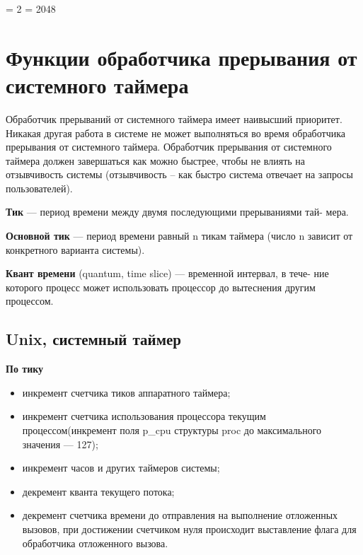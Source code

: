 \documentclass[a4paper,14pt,russian]{extreport}
\begin{document}
    \righthyphenmin = 2
    \tolerance = 2048
    
    
    \chapter{Функции обработчика прерывания от системного таймера}    
    Обработчик прерываний от системного таймера имеет наивысший приоритет.
    Никакая другая работа в системе не может выполняться во время обработчика прерывания от системного таймера.
    Обработчик прерывания от системного таймера должен завершаться как можно быстрее, чтобы не влиять на отзывчивость системы (отзывчивость – как быстро система отвечает на запросы пользователей).
    
    \textbf{Тик} --- период времени между двумя последующими прерываниями тай-
    мера.
    
    \textbf{Основной тик} --- период времени равный n тикам таймера (число n
    зависит от конкретного варианта системы).
    
    \textbf{Квант времени} (quantum, time slice) --- временной интервал, в тече-
    ние которого процесс может использовать процессор до вытеснения другим
    процессом.

    \section{Unix, системный таймер}
    \textbf{По тику}
    \begin{itemize}
    	\item инкремент счетчика тиков аппаратного таймера;
    	\item инкремент счетчика использования процессора текущим процессом(инкремент поля p\_cpu структуры proc до максимального значения --- 127);
    	\item инкремент часов и других таймеров системы;
    	\item декремент кванта текущего потока;
    	\item декремент счетчика времени до отправления на выполнение отложенных вызовов, при достижении счетчиком нуля происходит выставление флага для обработчика отложенного вызова.
    \end{itemize}
\end{document}
